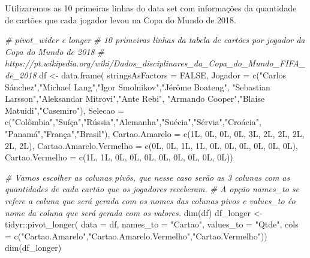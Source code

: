 \documentclass[
]{book}
\newenvironment{Shaded}{\begin{snugshade}}{\end{snugshade}}
\newcommand{\AttributeTok}[1]{\textcolor[rgb]{0.77,0.63,0.00}{#1}}
\newcommand{\CommentTok}[1]{\textcolor[rgb]{0.56,0.35,0.01}{\textit{#1}}}
\newcommand{\ConstantTok}[1]{\textcolor[rgb]{0.00,0.00,0.00}{#1}}
\newcommand{\FunctionTok}[1]{\textcolor[rgb]{0.00,0.00,0.00}{#1}}
\newcommand{\NormalTok}[1]{#1}
\newcommand{\OtherTok}[1]{\textcolor[rgb]{0.56,0.35,0.01}{#1}}
\newcommand{\SpecialCharTok}[1]{\textcolor[rgb]{0.00,0.00,0.00}{#1}}
\newcommand{\StringTok}[1]{\textcolor[rgb]{0.31,0.60,0.02}{#1}}
\begin{document}
Utilizaremos as 10 primeiras linhas do data set com informações da quantidade de cartões que cada jogador levou na Copa do Mundo de 2018.

\begin{Shaded}
\begin{Highlighting}[]
\CommentTok{\# pivot\_wider e longer}
\CommentTok{\# 10 primeiras linhas da tabela de cartões por jogador da Copa do Mundo de 2018}
\CommentTok{\# https://pt.wikipedia.org/wiki/Dados\_disciplinares\_da\_Copa\_do\_Mundo\_FIFA\_de\_2018}
\NormalTok{df }\OtherTok{\textless{}{-}} \FunctionTok{data.frame}\NormalTok{(}
  \AttributeTok{stringsAsFactors =} \ConstantTok{FALSE}\NormalTok{,}
  \AttributeTok{Jogador =} \FunctionTok{c}\NormalTok{(}\StringTok{"Carlos Sánchez"}\NormalTok{,}\StringTok{"Michael Lang"}\NormalTok{,}\StringTok{"Igor Smolnikov"}\NormalTok{,}\StringTok{"Jérôme Boateng"}\NormalTok{,}
              \StringTok{"Sebastian Larsson"}\NormalTok{,}\StringTok{"Aleksandar Mitrovi"}\NormalTok{,}\StringTok{"Ante Rebi"}\NormalTok{,}
              \StringTok{"Armando Cooper"}\NormalTok{,}\StringTok{"Blaise Matuidi"}\NormalTok{,}\StringTok{"Casemiro"}\NormalTok{),}
\AttributeTok{Selecao =} \FunctionTok{c}\NormalTok{(}\StringTok{"Colômbia"}\NormalTok{,}\StringTok{"Suíça"}\NormalTok{,}\StringTok{"Rússia"}\NormalTok{,}\StringTok{"Alemanha"}\NormalTok{,}\StringTok{"Suécia"}\NormalTok{,}\StringTok{"Sérvia"}\NormalTok{,}\StringTok{"Croácia"}\NormalTok{,}
            \StringTok{"Panamá"}\NormalTok{,}\StringTok{"França"}\NormalTok{,}\StringTok{"Brasil"}\NormalTok{),}
\AttributeTok{Cartao.Amarelo =} \FunctionTok{c}\NormalTok{(1L, 0L, 0L, 0L, 3L, 2L, 2L, 2L, 2L, 2L),}
\AttributeTok{Cartao.Amarelo.Vermelho =} \FunctionTok{c}\NormalTok{(0L, 0L, 1L, 1L, 0L, 0L, 0L, 0L, 0L, 0L),}
\AttributeTok{Cartao.Vermelho =} \FunctionTok{c}\NormalTok{(1L, 1L, 0L, 0L, 0L, 0L, 0L, 0L, 0L, 0L))}

\CommentTok{\# Vamos escolher as colunas pivôs, que nesse caso serão as 3 colunas com as quantidades de cada cartão que os jogadores receberam.}
\CommentTok{\# A opção names\_to se refere a coluna que será gerada com os nomes das colunas pivos e values\_to éo nome da coluna que será gerada com os valores.}
\FunctionTok{dim}\NormalTok{(df)}
\NormalTok{df\_longer }\OtherTok{\textless{}{-}}
\NormalTok{tidyr}\SpecialCharTok{::}\FunctionTok{pivot\_longer}\NormalTok{(}
  \AttributeTok{data =}\NormalTok{ df,}
  \AttributeTok{names\_to =} \StringTok{"Cartao"}\NormalTok{,}
  \AttributeTok{values\_to =} \StringTok{"Qtde"}\NormalTok{,}
  \AttributeTok{cols =} \FunctionTok{c}\NormalTok{(}\StringTok{"Cartao.Amarelo"}\NormalTok{,}\StringTok{"Cartao.Amarelo.Vermelho"}\NormalTok{,}\StringTok{"Cartao.Vermelho"}\NormalTok{))}
\FunctionTok{dim}\NormalTok{(df\_longer)}


\end{Highlighting}
\end{Shaded}
\end{document}
